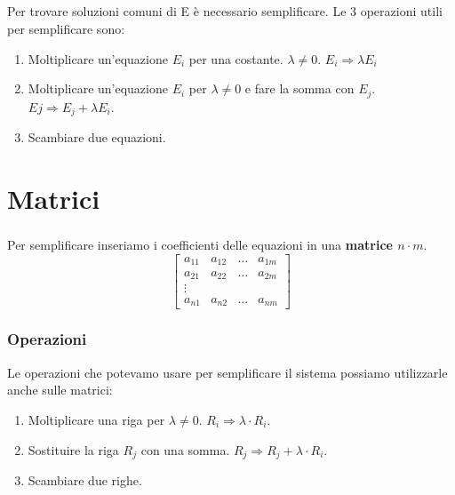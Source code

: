 \documentclass[a4paper, 12pt]{report}
\begin{document}
                    \paragraph{}Per trovare soluzioni comuni di E è necessario semplificare.
                    Le 3 operazioni utili per semplificare sono:
                            \begin{enumerate}[label=\Alph*)]
                                \item Moltiplicare un'equazione $E_i$ per una costante. $\lambda \neq 0$. $E_i\Rightarrow\lambda E_i$ 
                                \item Moltiplicare un'equazione $E_i$ per $\lambda \neq 0$ e fare la somma con $E_j$.\\ $Ej\Rightarrow E_j+\lambda E_i$. 
                                \item Scambiare due equazioni.
                            \end{enumerate}
        \chapter{Matrici}
            \paragraph{}Per semplificare inseriamo i coefficienti delle equazioni in una \textbf{matrice $n\cdot m$}.
            $$
            \begin{bmatrix}
                a_{11} & a_{12} & \dots & a_{1m}\\
                a_{21} & a_{22} & \dots & a_{2m}\\
                \vdots\\
                a_{n1} & a_{n2} & \dots & a_{nm}
            \end{bmatrix}
            $$
            \subsection{Operazioni}
                Le operazioni che potevamo usare per semplificare il sistema possiamo utilizzarle anche sulle matrici:
                    \begin{enumerate}[label=\Alph*)]
                        \item Moltiplicare una riga per $\lambda \neq 0$. $R_i \Rightarrow \lambda \cdot R_i$.
                        \item Sostituire la riga $R_j$ con una somma. $R_j \Rightarrow R_j + \lambda \cdot R_i$.
                        \item Scambiare due righe.
                    \end{enumerate}
\end{document}
